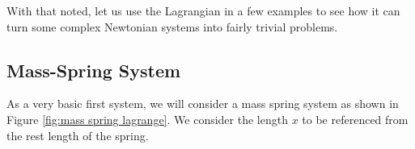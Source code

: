 \documentclass[12pt]{report}
\begin{document}
With that noted, let us use the \gls{Lagrangian} in a few examples to see how it can turn some complex Newtonian systems into fairly trivial problems.
\subsection{Mass-Spring System}
As a very basic first system, we will consider a mass spring system as shown in Figure \ref{fig:mass spring lagrange}. We consider the length $x$ to be referenced from the rest length of the spring.
\begin{figure}[ht]

\centering


\begin{tikzpicture}[x=0.75pt,y=0.75pt,yscale=-1,xscale=1]


\end{tikzpicture}
\end{figure}
\end{document}
